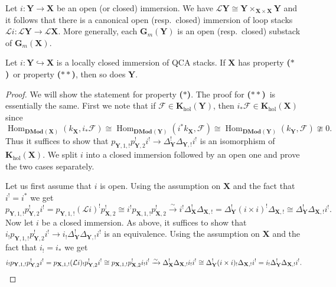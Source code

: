 \documentclass{oupau}
\theoremstyle{remark}
\let\stack\mathbf                           %
\newcommand\cat{\mathbf}                    %
\DeclareMathOperator\Hom{Hom}
\newcommand\isoto{\xrightarrow{\sim}}       %
\newcommand\sheaf\mathcal
\newcommand\catDMod[2][]{\cat{DMod}_{#1}(#2)}   %
\newcommand\bc{\textbf{($\mathbf{*}$)}}
\newcommand\hbc{\textbf{($\mathbf{**}$)}}
\newcommand\catK[2][]{\cat{K}_{#1}(#2)}
\newcommand\catKHol[1]{\catK[\mathrm{hol}]{#1}}
\newcommand\ls[1]{\mathcal{L} #1}
\begin{document}
Let $i\colon\stack Y \to \stack X$ be an open (or closed) immersion.
We have $\ls \stack Y \cong \stack Y \times_{\stack X \times \stack X} \stack Y$ and it follows that there is a canonical open (resp.~closed) immersion of loop stacks $\ls i\colon \ls \stack Y \to \ls \stack X$.
More generally, each $\stack G_m(\stack Y)$ is an open (resp.~closed) substack of $\stack G_m(\stack X)$.

\begin{lemma}\label{lem:lc_immersion}
    Let $i\colon\stack Y \hookrightarrow \stack X$ is a locally closed immersion of QCA stacks.
    If $\stack X$ has property \bc\ or property \hbc, then so does $\stack Y$.
\end{lemma}

\begin{proof}
    We will show the statement for property \bc.
    The proof for \hbc\ is essentially the same.
    First we note that if $\sheaf F \in \catKHol{\stack Y}$, then $i_*\sheaf F \in \catKHol{\stack X}$ since
    \[
      \Hom_{\catDMod{\stack X}}(k_{\stack X}, i_*\sheaf F) \cong
      \Hom_{\catDMod{\stack Y}}(i^*k_{\stack X}, \sheaf F) \cong
      \Hom_{\catDMod{\stack Y}}(k_{\stack Y}, \sheaf F) \ncong 0.
    \]
    Thus it suffices to show that $p_{\stack Y,1,!}p_{\stack Y,2}^!i^! \to \Delta_{\stack Y}^!\Delta_{\stack Y,!}i^!$ is an isomorphism of $\catKHol{\stack X}$.
    We split $i$ into a closed immersion followed by an open one and prove the two cases separately.

    Let us first assume that $i$ is open.
    Using the assumption on $\stack X$ and the fact that $i^! = i^*$ we get
    \[
        p_{\stack Y,1,!} p_{\stack Y,2}^!i^! =
        p_{\stack Y,1,!} (\ls i)^! p_{\stack X,2}^! \cong
        i^! p_{\stack X,1,!} p_{\stack X,2}^! \isoto
        i^! \Delta_{\stack X}^! \Delta_{\stack X,!} =
        \Delta_{\stack Y}^! (i\times i)^! \Delta_{\stack X,!} \cong
        \Delta_{\stack Y}^! \Delta_{\stack X,!} i^!.
    \]
    Now let $i$ be a closed immersion.
    As above, it suffices to show that $i_!p_{\stack Y,1,!}p_{\stack Y,2}^!i^! \to i_!\Delta_{\stack Y}^!\Delta_{\stack Y,!}i^!$ is an equivalence.
    Using the assumption on $\stack X$ and the fact that $i_! = i_*$ we get
    \[
        i_! p_{\stack Y,1,!} p_{\stack Y,2}^!i^! =
        p_{\stack X,1,!} (\ls i)_! p_{\stack Y,2}^!i^! \cong
        p_{\stack X,1,!} p_{\stack X,2}^! i_!i^! \isoto
        \Delta_{\stack X}^! \Delta_{\stack X,!} i_!i^! \cong
        \Delta_{\stack Y}^! (i\times i)_! \Delta_{\stack X,!}i^! =
        i_! \Delta_{\stack Y}^! \Delta_{\stack X,!} i^!.
        \qedhere
    \]
\end{proof}
\end{document}
